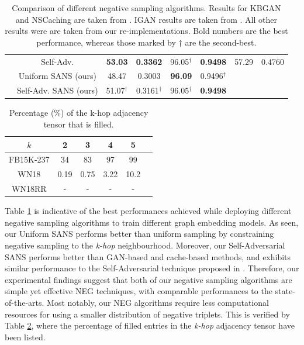 \begin{table}[h]
\begin{small}
\begin{tabular}{cccccccc}
& Self-Adv. & \textbf{53.03} & \textbf{0.3362} & 96.05$^\dagger$ & \textbf{0.9498} & 57.29 & 0.4760 \\
& Uniform SANS (ours) & 48.47 & 0.3003 & \textbf{96.09} & 0.9496$^\dagger$ \\
& Self-Adv. SANS (ours) & 51.07$^\dagger$ & 0.3161$^\dagger$ & 96.05$^\dagger$ & \textbf{0.9498} \\
\hline
\end{tabular}
\caption{Comparison of different negative sampling algorithms. Results for KBGAN and NSCaching are taken from \cite{zhang2019nscaching}. IGAN results are taken from \cite{wang2018incorporating}. 
All other results were are taken from our re-implementations. Bold numbers are the best performance, whereas those marked by $\dagger$ are the second-best. 
}
\label{tab:comparison}
\end{small}
\end{table}


\begin{table}[b]
\centering
\begin{tabular}{cccccc}
\hline
$k$ & 2 & 3 & 4 & 5 \\ 
\hline
FB15K-237 & 34 & 83 & 97 & 99 \\
\hline
WN18 & 0.19 & 0.75 & 3.22 & 10.2 \\
\hline
WN18RR & - & - & - & - \\
\hline
\end{tabular}
\caption{Percentage (\%) of the k-hop adjacency tensor that is filled.}
\label{tab:percentage}
\end{table}

Table \ref{tab:comparison} is indicative of the best performances achieved while deploying different negative sampling algorithms to train different graph embedding models. As seen, our Uniform SANS performs better than uniform sampling by constraining negative sampling to the \emph{k-hop} neighbourhood. Moreover, our Self-Adversarial SANS performs better than GAN-based and cache-based methods, and exhibits similar performance to the Self-Adversarial technique proposed in \cite{sun2019rotate}. Therefore, our experimental findings suggest that both of our negative sampling algorithms are simple yet effective NEG techniques, with comparable performances to the state-of-the-arts. Most notably, our NEG algorithms require less computational resources for using a smaller distribution of negative triplets. This is verified by Table \ref{tab:percentage}, where the percentage of filled entries in the \emph{k-hop} adjacency tensor have been listed. 

